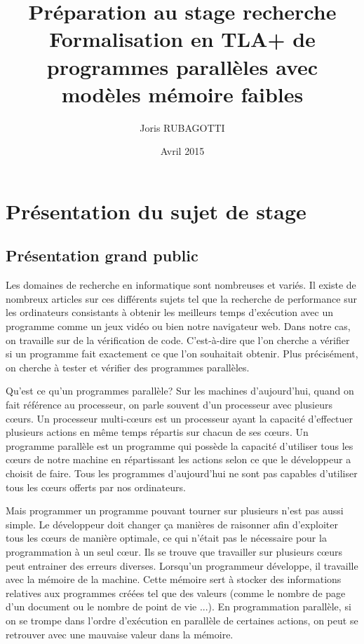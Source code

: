 \documentclass[12pt,a4paper]{article}
\title{Préparation au stage recherche \\ Formalisation en TLA+ de programmes parallèles avec modèles mémoire faibles}
\author{Joris RUBAGOTTI}
\date{Avril 2015}
\begin{document}
\maketitle

\section{Présentation du sujet de stage}

\subsection{Présentation grand public}

Les domaines de recherche en informatique sont nombreuses et variés. Il existe de nombreux articles sur ces différents sujets tel que la recherche de performance sur les ordinateurs consistants à obtenir les meilleurs temps d'exécution avec un programme comme un jeux vidéo ou bien notre navigateur web. Dans notre cas, on travaille sur de la vérification de code. C'est-à-dire que l'on cherche a vérifier si un programme fait exactement ce que l'on souhaitait obtenir. Plus précisément, on cherche à tester et vérifier des programmes parallèles.
 
Qu'est ce qu'un programmes parallèle? Sur les machines d'aujourd'hui, quand on fait référence au processeur, on parle souvent d'un processeur avec plusieurs cœurs. Un processeur multi-cœurs est un processeur ayant la capacité d'effectuer plusieurs actions en même temps répartis sur chacun de ses cœurs. Un programme parallèle est un programme qui possède la capacité d'utiliser tous les cœurs de notre machine en répartissant les actions selon ce que le développeur a choisit de faire. Tous les programmes d'aujourd'hui ne sont pas capables d'utiliser tous les cœurs offerts par nos ordinateurs.

Mais programmer un programme pouvant tourner sur plusieurs n'est pas aussi simple. Le développeur doit changer ça manières de raisonner afin d'exploiter tous les cœurs de manière optimale, ce qui n'était pas le nécessaire pour la programmation à un seul cœur. Ils se trouve que travailler sur plusieurs cœurs peut entrainer des erreurs diverses. Lorsqu'un programmeur développe, il travaille avec la mémoire de la machine. Cette mémoire sert à stocker des informations relatives aux programmes créées tel que des valeurs (comme le nombre de page d'un document ou le nombre de point de vie ...). En programmation parallèle, si on se trompe dans l'ordre d'exécution en parallèle de certaines actions, on peut se retrouver avec une mauvaise valeur dans la mémoire.
\end{document}
